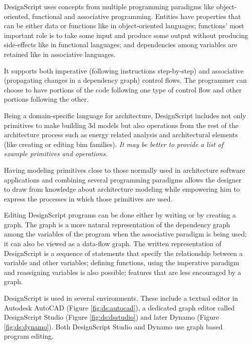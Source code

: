 \documentclass{./llncs2e/llncs}
\begin{document}
	DesignScript uses concepts from multiple programming paradigms like object-oriented, functional and associative programming. 
	Entities have properties that can be either data or functions like in object-oriented languages; functions' most important role is to take some input and produce some output without producing side-effects like in functional languages; and dependencies among variables are retained like in associative languages.

	It supports both imperative (following instructions step-by-step) and associative (propagating changes in a dependency graph) control flows. 
	The programmer can choose to have portions of the code following one type of control flow and other portions following the other.

	Being a domain-specific language for architecture, DesignScript includes not only primitives to make building 3d models but also operations from the rest of the architecture process such as energy related analysis and architectural elements (like creating or editing \ac{bim} families).
	\emph{It may be better to provide a list of example primitives and operations.}

	Having modeling primitives close to those normally used in architecture software applications and combining several programming paradigms allows the designer to draw from knowledge about architecture modeling while empowering him to express the processes in which those primitives are used.

	Editing DesignScript programs can be done either by writing or by creating a graph. 
	The graph is a more natural representation of the dependency graph among the variables of the program when the associative paradigm is being used; it can also be viewed as a data-flow graph. 
	The written representation of DesignScript is a sequence of statements that specify the relationship between a variable and other variables; defining functions, using the imperative paradigm and reassigning variables is also possible; features that are less encouraged by a graph.

	DesignScript is used in several environments. 
	These include a textual editor in Autodesk AutoCAD (Figure \ref{fig:ds:autocad}), a dedicated graph editor called DesignScript Studio (Figure \ref{fig:ds:dsstudio}) and later Dynamo (Figure \ref{fig:ds:dynamo}). 
	Both DesignScript Studio and Dynamo use graph based program editing.
\end{document}
